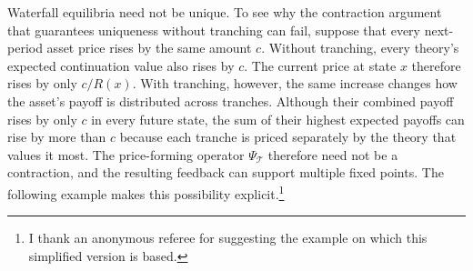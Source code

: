 \documentclass[11pt]{article}
\theoremstyle{plain}
\begin{document}
Waterfall equilibria need not be unique. To see why the contraction argument that guarantees uniqueness without tranching can fail, suppose that every next-period asset price rises by the same amount $c$. Without tranching, every theory's expected continuation value also rises by $c$. The current price at state $x$ therefore rises by only $c/R(x)$. With tranching, however, the same increase changes how the asset's payoff is distributed across tranches. Although their combined payoff rises by only $c$ in every future state, the sum of their highest expected payoffs can rise by more than $c$ because each tranche is priced separately by the theory that values it most. The price-forming operator $\Psi_{\mathcal{T}}$ therefore need not be a contraction, and the resulting feedback can support multiple fixed points. The following example makes this possibility explicit.\footnote{I thank an anonymous referee for suggesting the example on which this simplified version is based.}
\end{document}
